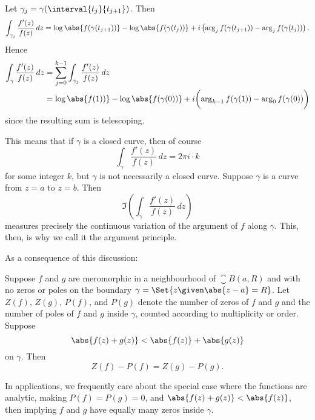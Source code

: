 Let $\gamma_j = \gamma(\interval{t_j}{t_{j + 1}})$.
Then
\[
	\int_{\gamma_j} \frac{f'(z)}{f(z)} \, d z = \log \abs{f(\gamma(t_{j + 1}))} - \log \abs{f(\gamma(t_j))} + i \left ( \arg_j f(\gamma(t_{j + 1})) - \arg_j f(\gamma(t_j)) \right ).
\]
Hence
\begin{align*}
	\int_\gamma \frac{f'(z)}{f(z)} \, d z &= \sum_{j = 0}^{k - 1} \int_{\gamma_j} \frac{f'(z)}{f(z)} \, d z \\
	&= \log\abs{f(1))} - \log\abs{f(\gamma(0))} + i \biggl ( \arg_{k - 1} f(\gamma(1)) - \arg_0 f(\gamma(0)) \biggr )
\end{align*}
since the resulting sum is telescoping.

This means that if $\gamma$ is a closed curve, then of course
\[
	\int_\gamma \frac{f'(z)}{f(z)} \, d z = 2 \pi i \cdot k
\]
for some integer $k$, but $\gamma$ is not necessarily a closed curve.
Suppose $\gamma$ is a curve from $z = a$ to $z = b$.
Then
\[
	\Im \left ( \int_\gamma \frac{f'(z)}{f(z)} \, d z \right )
\]
measures precisely the continuous variation of the argument of $f$ along $\gamma$.
This, then, is why we call it the argument principle.

As a consequence of this discussion:

\begin{theorem}\label{thm5.8}
	Suppose $f$ and $g$ are meromorphic in a neighbourhood of $\closure{B(a, R)}$ and with no zeros or poles on the boundary $\gamma = \Set{z \given \abs{z - a} = R}$.
	Let $Z(f)$, $Z(g)$, $P(f)$, and $P(g)$ denote the number of zeros of $f$ and $g$ and the number of poles of $f$ and $g$ inside $\gamma$, counted according to multiplicity or order.
	Suppose
	\[
		\abs{f(z) + g(z)} < \abs{f(z)} + \abs{g(z)}
	\]
	on $\gamma$.
	Then
	\[
		Z(f) - P(f) = Z(g) - P(g).
	\]
\end{theorem}

\begin{remark}
	In applications, we frequently care about the special case where the functions are analytic, making $P(f) = P(g) = 0$, and $\abs{f(z) + g(z)} < \abs{f(z)}$, then implying $f$ and $g$ have equally many zeros inside $\gamma$.
\end{remark}


